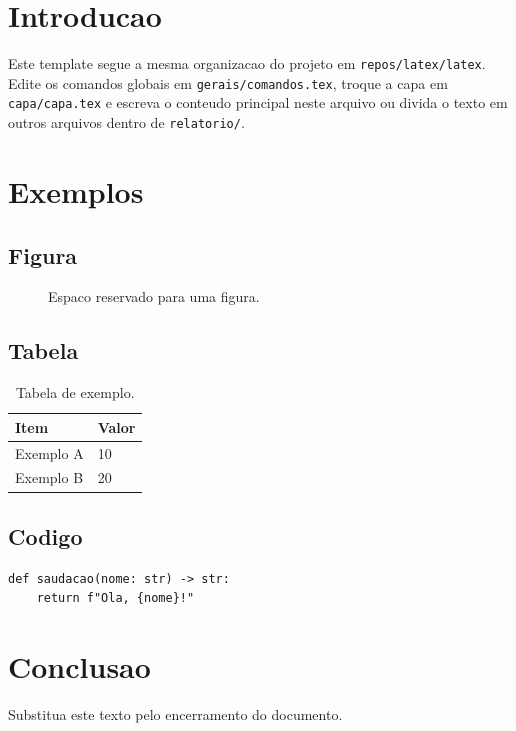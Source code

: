 
\section{Introducao}

Este template segue a mesma organizacao do projeto em
\texttt{repos/latex/latex}. Edite os comandos globais em
\texttt{gerais/comandos.tex}, troque a capa em \texttt{capa/capa.tex} e escreva
o conteudo principal neste arquivo ou divida o texto em outros arquivos dentro
de \texttt{relatorio/}.

\section{Exemplos}

\subsection{Figura}

\begin{figure}[H]
  \centering
  \fbox{\rule{0pt}{4cm}\rule{0.7\textwidth}{0pt}}
  \caption{Espaco reservado para uma figura.}
\end{figure}

\subsection{Tabela}

\begin{table}[H]
  \centering
  \begin{tabular}{p{4cm}p{3cm}}
    \toprule
    Item & Valor \\
    \midrule
    Exemplo A & 10 \\
    Exemplo B & 20 \\
    \bottomrule
  \end{tabular}
  \caption{Tabela de exemplo.}
\end{table}

\subsection{Codigo}

\begin{verbatim}
def saudacao(nome: str) -> str:
    return f"Ola, {nome}!"
\end{verbatim}

\section{Conclusao}

Substitua este texto pelo encerramento do documento.
